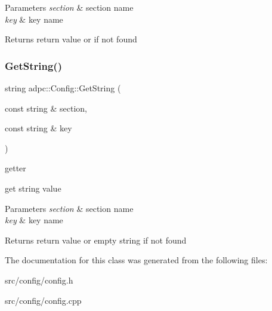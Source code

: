 \begin{DoxyParams}{Parameters}
{\em section} & section name \\
\hline
{\em key} & key name \\
\hline
\end{DoxyParams}
\begin{DoxyReturn}{Returns}
return value or {} if not found 
\end{DoxyReturn}
\mbox{\label{classadpc_1_1Config_aeb4893a500149d3ae44614767e496132}} 
\subsubsection{\texorpdfstring{Get\+String()}{GetString()}}
{\footnotesize\ttfamily string adpc\+::\+Config\+::\+Get\+String (\begin{DoxyParamCaption}\item[{const string \&}]{section,  }\item[{const string \&}]{key }\end{DoxyParamCaption})}



getter 

get string value 
\begin{DoxyParams}{Parameters}
{\em section} & section name \\
\hline
{\em key} & key name \\
\hline
\end{DoxyParams}
\begin{DoxyReturn}{Returns}
return value or empty string if not found 
\end{DoxyReturn}


The documentation for this class was generated from the following files\+:\begin{DoxyCompactItemize}
\item 
src/config/config.\+h\item 
src/config/config.\+cpp\end{DoxyCompactItemize}
